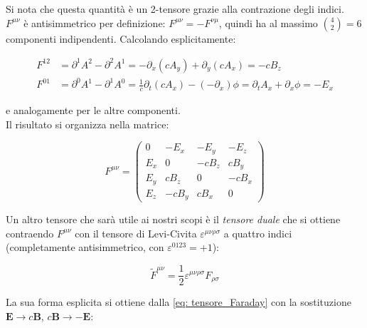 Si nota che questa quantità è un 2-tensore grazie alla contrazione degli indici. \\

$F^{\mu\nu}$ è antisimmetrico per definizione: $F^{\mu\nu} = -F^{\nu\mu}$, quindi ha al massimo $\binom{4}{2} = 6$ componenti indipendenti. 
Calcolando esplicitamente:

\begin{align}
    F^{12} &= \partial^1 A^2 - \partial^2 A^1 =  -\partial_x(cA_y) + \partial_y(cA_x) = -cB_z \\
    F^{01} &= \partial^0 A^1 - \partial^1 A^0 = \frac{1}{c}\partial_t(cA_x) - (-\partial_x)\phi = \partial_t A_x + \partial_x\phi = -E_x
\end{align}

e analogamente per le altre componenti. \\

Il risultato si organizza nella matrice:

\begin{tcolorbox}[colback=yellow!10!white, colframe=orange!70!black, boxrule=0.8pt]
\begin{equation}\label{eq: tensore_Faraday}
    F^{\mu\nu} = 
    \begin{pmatrix} 
    0 & -E_x & -E_y & -E_z \\ 
    E_x & 0 & -cB_z & cB_y \\ 
    E_y & cB_z & 0 & -cB_x \\ 
    E_z & -cB_y & cB_x & 0 
    \end{pmatrix}
\end{equation}
\end{tcolorbox}

Un altro tensore che sarà utile ai nostri scopi è il \emph{tensore duale} che si ottiene contraendo $F^{\mu\nu}$ con il tensore di Levi-Civita $\varepsilon^{\mu\nu\rho\sigma}$ a quattro indici (completamente antisimmetrico, con $\varepsilon^{0123} = +1$):

\begin{tcolorbox}[colback=yellow!10!white, colframe=orange!70!black, boxrule=0.8pt]
\begin{equation}
    \tilde{F}^{\mu\nu} = \frac{1}{2}\varepsilon^{\mu\nu\rho\sigma} F_{\rho\sigma}
\end{equation}
\end{tcolorbox}

La sua forma esplicita si ottiene dalla \eqref{eq: tensore_Faraday} con la sostituzione $\mathbf{E} \to c\mathbf{B}$, $c\mathbf{B} \to -\mathbf{E}$:


